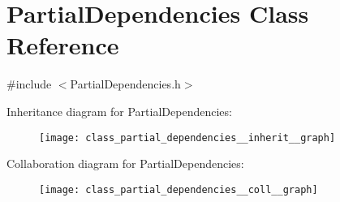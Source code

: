 \hypertarget{class_partial_dependencies}{}\section{Partial\+Dependencies Class Reference}
\label{class_partial_dependencies}


{\ttfamily \#include $<$Partial\+Dependencies.\+h$>$}



Inheritance diagram for Partial\+Dependencies\+:\nopagebreak
\begin{figure}[H]
\begin{center}
\leavevmode
\texttt{[image: class\_partial\_dependencies\_\_inherit\_\_graph]}
\end{center}
\end{figure}


Collaboration diagram for Partial\+Dependencies\+:\nopagebreak
\begin{figure}[H]
\begin{center}
\leavevmode
\texttt{[image: class\_partial\_dependencies\_\_coll\_\_graph]}
\end{center}
\end{figure}

